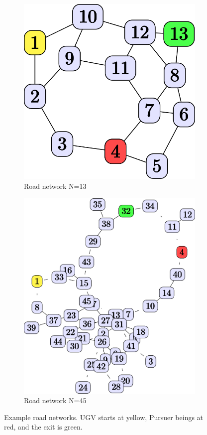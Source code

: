 \begin{figure}[tbp]
    \centering
    \begin{subfigure}[b]{0.50\linewidth}
        \centering
        \includegraphics[width=0.7\linewidth]{Figures/original_roadnet.png}
        \vfill
        \caption{Road network N=13}
        \label{fig:roadnet}
    \end{subfigure}%
    \hfill
    \begin{subfigure}[b]{0.50\linewidth}
        \centering
        \includegraphics[width=0.6\linewidth]{Figures/medium_roadnet.png}
        \caption{Road network N=45}
        \label{fig:med_roadnet}
    \end{subfigure} 
    \caption{Example road networks. UGV starts at yellow, Pursuer beings at red, and the exit is green.}
    \vspace{-0.2cm}
\end{figure}

